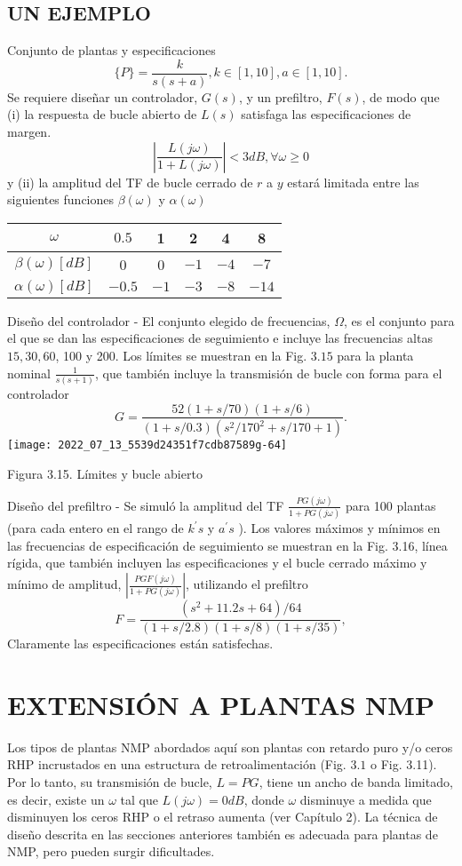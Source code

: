 \subsection{UN EJEMPLO}
Conjunto de plantas y especificaciones
$$
\{P\}=\frac{k}{s(s+a)}, k \in[1,10], a \in[1,10] .
$$
Se requiere diseñar un controlador, $G(s)$, y un prefiltro, $F(s)$, de modo que (i) la respuesta de bucle abierto de $L(s)$ satisfaga las especificaciones de margen.
$$
\left|\frac{L(j \omega)}{1+L(j \omega)}\right|<3 d B, \forall \omega \geq 0
$$
y (ii) la amplitud del TF de bucle cerrado de $r$ a $y$ estará limitada entre las siguientes funciones $\beta(\omega)$ y $\alpha(\omega)$

\begin{tabular}{|c|c|c|c|c|c|}
\hline
$\omega$ & $0.5$ & 1 & 2 & 4 & 8 \\
\hline
$\beta(\omega)[d B]$ & 0 & 0 & $-1$ & $-4$ & $-7$ \\
\hline
$\alpha(\omega)[d B]$ & $-0.5$ & $-1$ & $-3$ & $-8$ & $-14$ \\
\hline
\end{tabular}

Diseño del controlador - El conjunto elegido de frecuencias, $\Omega$, es el conjunto para el que se dan las especificaciones de seguimiento e incluye las frecuencias altas $15,30,60$, 100 y 200. Los límites se muestran en la Fig. $3.15$ para la planta nominal $\frac{1}{s(s+1)}$, que también incluye la transmisión de bucle con forma para el controlador
$$
G=\frac{52(1+s / 70)(1+s / 6)}{(1+s / 0.3)\left(s^{2} / 170^{2}+s / 170+1\right)} .
$$
\texttt{[image: 2022\_07\_13\_5539d24351f7cdb87589g-64]}

Figura 3.15. Límites y bucle abierto

Diseño del prefiltro - Se simuló la amplitud del TF $\frac{P G(j \omega)}{1+P G(j \omega)}$ para 100 plantas (para cada entero en el rango de $k^{\prime} s$ y $a^{\prime} s$ ). Los valores máximos y mínimos en las frecuencias de especificación de seguimiento se muestran en la Fig. 3.16, línea rígida, que también incluyen las especificaciones y el bucle cerrado máximo y mínimo de amplitud, $\left|\frac{P G F(j \omega)}{1+P G(j \omega)}\right|$, utilizando el prefiltro
$$
F=\frac{\left(s^{2}+11.2 s+64\right) / 64}{(1+s / 2.8)(1+s / 8)(1+s / 35)},
$$
Claramente las especificaciones están satisfechas.

\section{EXTENSIÓN A PLANTAS NMP}
Los tipos de plantas NMP abordados aquí son plantas con retardo puro y/o ceros RHP incrustados en una estructura de retroalimentación (Fig. $3.1$ o Fig. 3.11). Por lo tanto, su transmisión de bucle, $L=P G$, tiene un ancho de banda limitado, es decir, existe un $\omega$ tal que $L(j \omega)=0 d B$, donde $\omega$ disminuye a medida que disminuyen los ceros RHP o el retraso aumenta (ver Capítulo 2). La técnica de diseño descrita en las secciones anteriores también es adecuada para plantas de NMP, pero pueden surgir dificultades.

